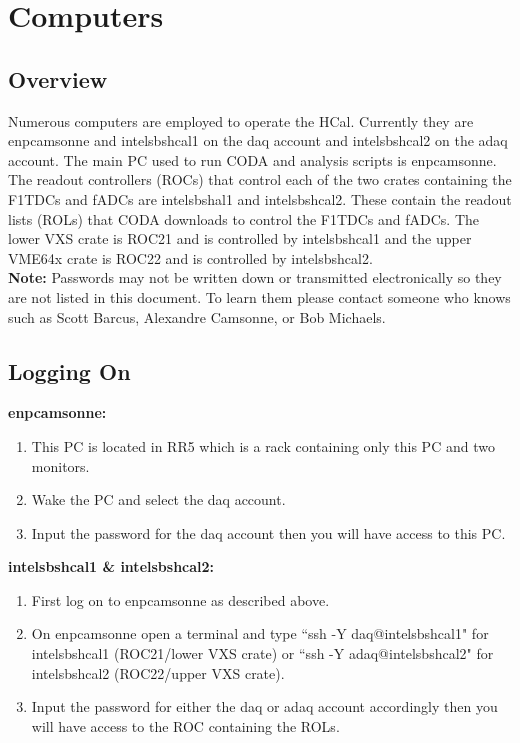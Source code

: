 \documentclass[oneside]{book}   %
\begin{document}
\chapter{Computers}
\label{ch:computers}
\section{Overview}
\label{sec:computers_overview}

Numerous computers are employed to operate the HCal. Currently they are enpcamsonne and intelsbshcal1 on the daq account and intelsbshcal2 on the adaq account. The main PC used to run CODA and analysis scripts is enpcamsonne. The readout controllers (ROCs) that control each of the two crates containing the F1TDCs and fADCs are intelsbshal1 and intelsbshcal2. These contain the readout lists (ROLs) that CODA downloads to control the F1TDCs and fADCs. The lower VXS crate is ROC21 and is controlled by intelsbshcal1 and the upper VME64x crate is ROC22 and is controlled by intelsbshcal2.\\

\textbf{\large{Note:}} 
Passwords may not be written down or transmitted electronically so they are not listed in this document. To learn them please contact someone who knows such as Scott Barcus, Alexandre Camsonne, or Bob Michaels.

\section{Logging On}
\label{sec:logging_on}

\textbf{\large{enpcamsonne:}}
\begin{enumerate}
	\item This PC is located in RR5 which is a rack containing only this PC and two monitors.
	\item Wake the PC and select the daq account.
	\item Input the password for the daq account then you will have access to this PC.
\end{enumerate}

\textbf{\large{intelsbshcal1 \& intelsbshcal2:}}
\begin{enumerate}
	\item First log on to enpcamsonne as described above.
	\item On enpcamsonne open a terminal and type ``ssh -Y daq@intelsbshcal1" for intelsbshcal1 (ROC21/lower VXS crate) or ``ssh -Y adaq@intelsbshcal2" for intelsbshcal2 (ROC22/upper VXS crate).
	\item Input the password for either the daq or adaq account accordingly then you will have access to the ROC containing the ROLs.
\end{enumerate}
\end{document}
